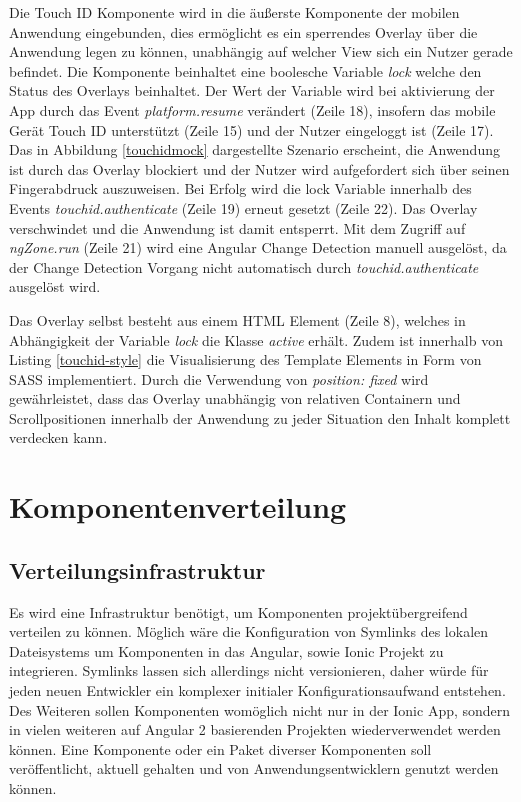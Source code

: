 Die Touch ID Komponente wird in die äußerste Komponente der mobilen Anwendung eingebunden,
dies ermöglicht es ein sperrendes Overlay über die Anwendung legen zu können, unabhängig auf welcher
View sich ein Nutzer gerade befindet. Die Komponente beinhaltet eine boolesche Variable \emph{lock}
welche den Status des Overlays beinhaltet. Der Wert der Variable wird bei aktivierung der App durch das Event \emph{platform.resume}
verändert (Zeile 18), insofern das mobile Gerät Touch ID unterstützt (Zeile 15) und der Nutzer eingeloggt ist (Zeile 17).
Das in Abbildung \ref{touchidmock} dargestellte Szenario erscheint, die Anwendung ist durch das Overlay blockiert und der Nutzer wird aufgefordert sich über seinen Fingerabdruck auszuweisen.
Bei Erfolg wird die lock Variable innerhalb des Events \emph{touchid.authenticate} (Zeile 19) erneut gesetzt (Zeile 22).
Das Overlay verschwindet und die Anwendung ist damit entsperrt. Mit dem Zugriff auf \emph{ngZone.run} (Zeile 21) wird eine Angular Change Detection manuell ausgelöst, da der Change Detection Vorgang nicht automatisch durch \emph{touchid.authenticate} ausgelöst wird.

Das Overlay selbst besteht aus einem \ac{HTML} Element (Zeile 8), welches in Abhängigkeit der Variable \emph{lock} die Klasse \emph{active} erhält.
Zudem ist innerhalb von Listing \ref{touchid-style} die Visualisierung des Template Elements in Form von \ac{SASS} implementiert.
Durch die Verwendung von \emph{position: fixed} wird gewährleistet, dass das Overlay unabhängig von relativen Containern und Scrollpositionen innerhalb der Anwendung zu jeder Situation den Inhalt komplett verdecken kann.









\newpage
\section{Komponentenverteilung}

\subsection{Verteilungsinfrastruktur}

Es wird eine Infrastruktur benötigt, um Komponenten projektübergreifend verteilen zu können.
Möglich wäre die Konfiguration von Symlinks des lokalen Dateisystems um Komponenten in das Angular,
sowie Ionic Projekt zu integrieren. Symlinks lassen sich allerdings nicht versionieren, daher würde
für jeden neuen Entwickler ein komplexer initialer Konfigurationsaufwand entstehen.
Des Weiteren sollen Komponenten womöglich nicht nur in der Ionic App,
sondern in vielen weiteren auf Angular 2 basierenden Projekten wiederverwendet werden können.
Eine Komponente oder ein Paket diverser Komponenten soll veröffentlicht, aktuell
gehalten und von Anwendungsentwicklern genutzt werden können.

